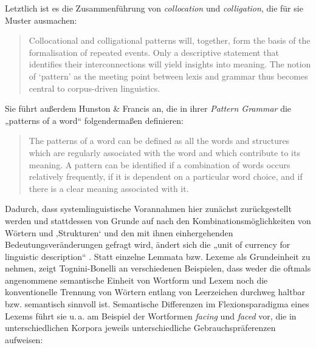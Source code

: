 Letztlich ist es die Zusammenführung von \emph{collocation} und \emph{colligation}, die für sie Muster ausmachen:

\begin{quote}
Collocational and colligational patterns will, together, form the basis of the formalisation of repeated events. Only a descriptive statement that identifies their interconnections will yield insights into meaning. The notion of `pattern' as the meeting point between lexis and grammar thus becomes central to corpus-driven linguistics. \autocite[90]{tognini-bonelliCorpusLinguisticsWork2001}
\end{quote}

Sie führt außerdem Hunston \& Francis an, die in ihrer \emph{Pattern Grammar} die „patterns of a word`` folgendermaßen definieren:

\begin{quote}
The patterns of a word can be defined as all the words and structures which are regularly associated with the word and which contribute to its meaning. A pattern can be identified if a combination of words occurs relatively frequently, if it is dependent on a particular word choice, and if there is a clear meaning associated with it. \autocite[37]{hunstonPatternGrammarCorpusDriven2000}
\end{quote}

Dadurch, dass systemlinguistische Vorannahmen hier zunächst zurückgestellt werden und stattdessen von Grunde auf nach den Kombinationsmöglichkeiten von Wörtern und ‚Strukturen` und den mit ihnen einhergehenden Bedeutungsveränderungen gefragt wird, ändert sich die „unit of currency for linguistic description`` \autocite[91]{tognini-bonelliCorpusLinguisticsWork2001}. Statt einzelne Lemmata bzw. Lexeme als Grundeinheit zu nehmen, zeigt Tognini-Bonelli an verschiedenen Beispielen, dass weder die oftmals angenommene semantische Einheit von Wortform und Lexem noch die konventionelle Trennung von Wörtern entlang von Leerzeichen durchweg haltbar bzw. semantisch sinnvoll ist. Semantische Differenzen im Flexionsparadigma eines Lexems führt sie u.\,a. am Beispiel der Wortformen \emph{facing} und \emph{faced} vor, die in unterschiedlichen Korpora jeweils unterschiedliche Gebrauchspräferenzen aufweisen:

